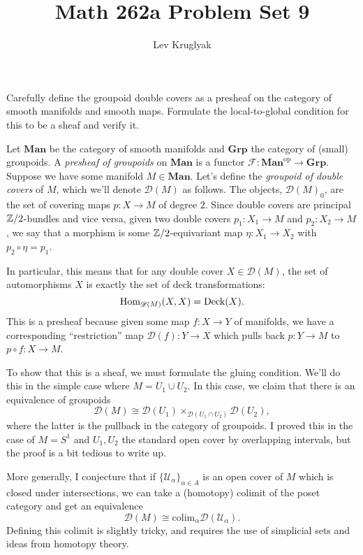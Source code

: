 \documentclass{pset}
\title{Math 262a Problem Set 9}
\author{Lev Kruglyak}
\providecommand{\Man}{\mathbf{Man}}
\providecommand{\op}{\mathrm{op}}
\providecommand{\Grp}{\mathbf{Grp}}
\begin{document}
\maketitle

\begin{problem}{1}
  Carefully define the groupoid double covers as a presheaf on the category of smooth manifolds and smooth maps. Formulate the local-to-global condition for this to be a sheaf and verify it. 
\end{problem}

\begin{solution}
  Let $\Man$ be the category of smooth manifolds and $\Grp$ the category of (small) groupoids. A \emph{presheaf of groupoids} on $\Man$ is a functor $\mathscr{F} : \Man^\op \to \Grp$. Suppose we have some manifold $M\in \Man$. Let's define the \emph{groupoid of double covers} of $M$, which we'll denote $\mathscr{D}(M)$ as follows. The objects, $\mathscr{D}(M)_0$, are the set of covering maps $p : X \to M$ of degree $2$. Since double covers are principal $\mathbb{Z}/2$-bundles and vice versa, given two double covers $p_1 : X_1 \to M$ and $p_2 : X_2 \to M$, we say that a morphism is some $\mathbb{Z}/2$-equivariant map $\eta : X_1 \to X_2$ with $p_2\circ \eta = p_1$.

  In particular, this means that for any double cover $X\in \mathscr{D}(M)$, the set of automorphisms $X$ is exactly the set of deck transformations:
  \[
    \textrm{Hom}_{\mathscr{D}(M)}(X, X) = \textrm{Deck}(X).
  \]
  This is a presheaf because given some map $f : X \to Y$ of manifolds, we have a corresponding ``restriction'' map $\mathscr{D}(f) : Y \to X$ which pulls back $p : Y \to M$ to $p\circ f : X \to M$.

  To show that this is a sheaf, we must formulate the gluing condition. We'll do this in the simple case where $M=U_1\cup U_2$. In this case, we claim that there is an equivalence of groupoids
  \[
    \mathscr{D}(M) \cong \mathscr{D}(U_1)\times_{\mathscr{D}(U_1\cap U_2)} \mathscr{D}(U_2),
  \]
  where the latter is the pullback in the category of groupoids. I proved this in the case of $M=S^1$ and $U_1, U_2$ the standard open cover by overlapping intervals, but the proof is a bit tedious to write up.

  More generally, I conjecture that if $\{\mathcal{U}_\alpha\}_{\alpha\in A}$ is an open cover of $M$ which is closed under intersections, we can take a (homotopy) colimit of the poset category and get an equivalence 
  \[
    \mathscr{D}(M) \cong \textrm{colim}_{\alpha} \mathscr{D}(\mathcal{U}_\alpha).
  \]
  Defining this colimit is slightly tricky, and requires the use of simplicial sets and ideas from homotopy theory.
\end{solution}
\end{document}
